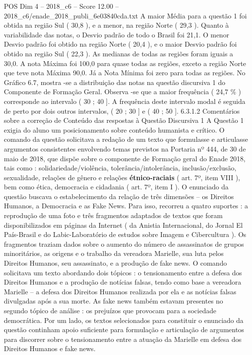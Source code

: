 \begin{textsample}{POS Dim 4 – 2018\_c6 – Score 12.00 – 2018\_c6/enade\_2018\_publi\_6e03840cda.txt}
A maior Média para a questão 1 foi obtida na região Sul ( 30,8 ), e a menor, na região Norte ( 29,3 ).
Quanto à variabilidade das notas, o Desvio padrão de todo o Brasil foi 21,1.
O menor Desvio padrão foi obtido na região Norte ( 20,4 ), e o maior Desvio padrão foi obtido na região Sul ( 22,3 ).
As medianas de todas as regiões foram iguais a 30,0.
A nota Máxima foi 100,0 para quase todas as regiões, exceto a região Norte que teve nota Máxima 90,0.
Já a Nota Mínima foi zero para todas as regiões.
No Gráfico 6.7, mostra -se a distribuição das notas na questão discursiva 1 do Componente de Formação Geral.
Observa -se que a maior frequência ( 24,7 \% ) corresponde ao intervalo ( 30 ; 40 ].
A frequência deste intervalo modal é seguida de perto por dois outros intervalos, ( 20 ; 30 ] e ( 40 ; 50 ]. 6.3.1.2 Comentários sobre a correção de Conteúdo das respostas à Questão Discursiva 1 A Questão 1 exigia do aluno um posicionamento sobre conteúdo humanista e crítico.
O comando da questão solicitava a redação de um texto que formulasse e articulasse argumentos consistentes envolvendo temas previstos na Portaria nº 444, de 30 de maio de 2018, que dispõe sobre o componente de Formação geral do Enade 2018, tais como : solidariedade/violência, tolerância/intolerância, inclusão/exclusão, sexualidade, relações de gênero e relações \textbf{étnico-raciais} ( art. 7º, item VIII ), bem como ética, democracia e cidadania ( art. 7º, item I ).
O enunciado da questão buscava o estabelecimento da relação de três dimensões – os Direitos Humanos, a Democracia e as Fake News.
Para isso, recorreu a quatro suportes : a reprodução de uma foto e três fragmentos adaptados de textos que foram disponibilizados em páginas da Internet ( da Anistia Internacional, do Jornal El País-Brasil e do Labic-Laboratório de estudos sobre Imagem e Cibercultura ).
Os fragmentos traziam dados sobre o aumento do número de assassinatos de grupos minoritários, as origens e o trabalho da vereadora Marielle, sua luta pelos Direitos Humanos, seu assassinato, e a produção de fake news.
O comando solicitava um texto abordando dois tópicos : o tensionamento entre a defesa dos Direitos Humanos e a produção de notícias falsas, tendo como base a vereadora Marielle – a defesa dos Direitos Humanos realizada por ela e as notícias falsas divulgadas após a sua morte.
As fake news também estavam presentes no segundo tópico de análise : os prejuízos que provocam para a sociedade democrática.
Por um lado, os textos selecionados para constituir o enunciado da questão continham apoio suficiente para formulação e articulação de argumentos para discorrer sobre o tensionamento entre a atuação da Marielle em defesa dos Direitos Humanos e fake news.

\end{textsample}
